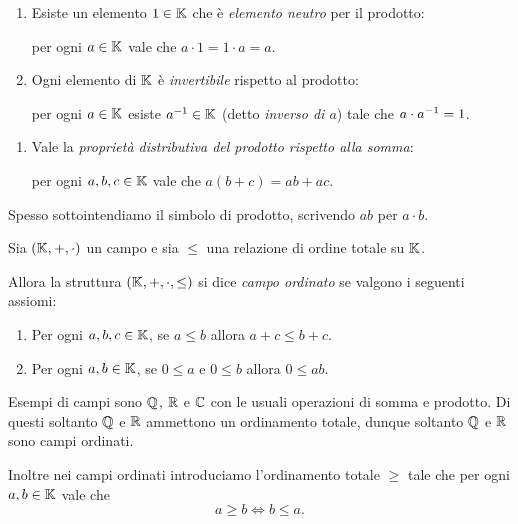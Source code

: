 \begin{definition} [Campo]
\begin{enumerate}[label={(P\arabic*)}]
        per ogni $a, b, c \in \K$ vale che $(a \cdot b) \cdot c = a \cdot (b \cdot c)$.
        \item \label{def:campo_prod:neu} Esiste un elemento $1 \in \mathbb{K}$ che è \emph{elemento neutro} per il prodotto:
        
        per ogni $a \in \mathbb{K}$ vale che $a \cdot 1 = 1 \cdot a = a$.
        \item \label{def:campo_prod:inv} Ogni elemento di $\mathbb{K}$ è \emph{invertibile} rispetto al prodotto:
        
        per ogni $a \in \mathbb{K}$ esiste $a^{-1} \in \mathbb{K}$ (detto \emph{inverso di $a$}) tale che $a \cdot a^{-1} = 1$.
    \end{enumerate}
    \begin{enumerate}[label=(SP)]
        \item \label{def:campo:distr} Vale la \emph{proprietà distributiva del prodotto rispetto alla somma}:
         
        per ogni $a, b, c \in \K$ vale che $a(b + c) = ab + ac$.
    \end{enumerate}
\end{definition}

Spesso sottointendiamo il simbolo di prodotto, scrivendo $ab$ per $a \cdot b$.

\begin{definition} 
    \label{def:campo_ord}
    Sia $(\mathbb{K}, +, \cdot)$ un campo e sia $\leq$ una relazione di ordine totale su $\mathbb{K}$.
    
    Allora la struttura $(\mathbb{K}, +, \cdot, \leq)$ si dice \emph{campo ordinato} se valgono i seguenti assiomi:
    \begin{enumerate}[label={(CO\arabic*)}]
        \item \label{def:campo_ord:ord_sum} Per ogni $a, b, c \in \K$, se $a \leq b$ allora $a + c \leq b + c$.
        \item \label{def:campo_ord:ord_prod} Per ogni $a, b \in \mathbb{K}$, se $0 \leq a$ e $0 \leq b$ allora $0 \leq ab$.
    \end{enumerate}
\end{definition}

Esempi di campi sono $\mathbb{Q}$, $\mathbb{R}$ e $\mathbb{C}$ con le usuali operazioni di somma e prodotto. Di questi soltanto $\mathbb{Q}$ e $\mathbb{R}$ ammettono un ordinamento totale, dunque soltanto $\mathbb{Q}$ e $\mathbb{R}$ sono campi ordinati.

Inoltre nei campi ordinati introduciamo l'ordinamento totale $\geq$ tale che per ogni $a, b \in \mathbb{K}$ vale che \[
    a \geq b \iff b \leq a.    
\]

